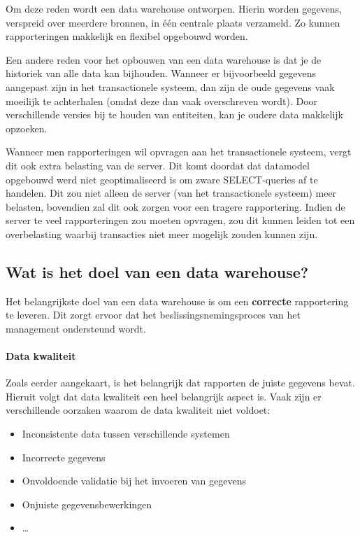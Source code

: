 Om deze reden wordt een data warehouse ontworpen. Hierin worden gegevens, verspreid over meerdere bronnen, in één centrale plaats verzameld. Zo kunnen rapporteringen makkelijk en flexibel opgebouwd worden. 

Een andere reden voor het opbouwen van een data warehouse is dat je de historiek van alle data kan bijhouden. Wanneer er bijvoorbeeld gegevens aangepast zijn in het transactionele systeem, dan zijn de oude gegevens vaak moeilijk te achterhalen (omdat deze dan vaak overschreven wordt). Door verschillende versies bij te houden van entiteiten, kan je oudere data makkelijk opzoeken.

Wanneer men rapporteringen wil opvragen aan het transactionele systeem, vergt dit ook extra belasting van de server. Dit komt doordat dat datamodel opgebouwd werd niet geoptimaliseerd is om zware SELECT-queries af te handelen. Dit zou niet alleen de server (van het transactionele systeem) meer belasten, bovendien zal dit ook zorgen voor een tragere rapportering. Indien de server te veel rapporteringen zou moeten opvragen, zou dit kunnen leiden tot een overbelasting waarbij transacties niet meer mogelijk zouden kunnen zijn. 


\subsection{Wat is het doel van een data warehouse?}
Het belangrijkste doel van een data warehouse is om een \textbf{correcte} rapportering te leveren. Dit zorgt ervoor dat het beslissingsnemingsproces van het management ondersteund wordt. 

\paragraph{Data kwaliteit}
Zoals eerder aangekaart, is het belangrijk dat rapporten de juiste gegevens bevat. Hieruit volgt dat data kwaliteit een heel belangrijk aspect is. Vaak zijn er verschillende oorzaken waarom de data kwaliteit niet voldoet:

\begin{itemize}
	\item Inconsistente data tussen verschillende systemen
	\item Incorrecte gegevens
	\item Onvoldoende validatie bij het invoeren van gegevens
	\item Onjuiste gegevensbewerkingen
	\item \ldots
\end{itemize}  
~\autocite{Helfert2002}

